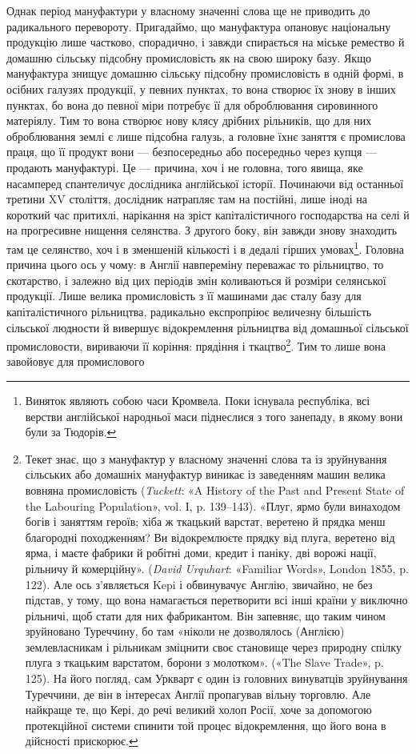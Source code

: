 Однак період мануфактури у власному значенні слова ще не
приводить до радикального перевороту. Пригадаймо, що мануфактура
опановує національну продукцію лише частково, спорадично,
і завжди спирається на міське ремество й домашню
сільську підсобну промисловість як на свою широку базу.
Якщо мануфактура знищує домашню сільську підсобну промисловість
в одній формі, в осібних галузях продукції, у певних
пунктах, то вона створює їх знову в інших пунктах, бо вона до
певної міри потребує її для оброблювання сировинного матеріялу.
Тим то вона створює нову клясу дрібних рільників, що для них
оброблювання землі є лише підсобна галузь, а головне їхнє заняття
є промислова праця, що її продукт вони — безпосередньо
або посередньо через купця — продають мануфактурі. Це —
причина, хоч і не головна, того явища, яке насамперед спантеличує
дослідника англійської історії. Починаючи від останньої
третини XV століття, дослідник натрапляє там на постійні,
лише іноді на короткий час притихлі, нарікання на зріст капіталістичного
господарства на селі й на прогресивне нищення
селянства. З другого боку, він завжди знову знаходить там це
селянство, хоч і в зменшеній кількості і в дедалі гірших умовах\footnote{
Виняток являють собою часи Кромвела. Поки існувала республіка,
всі верстви англійської народньої маси піднеслися з того занепаду,
в якому вони були за Тюдорів.
}.
Головна причина цього ось у чому: в Англії навпереміну переважає
то рільництво, то скотарство, і залежно від цих періодів
змін коливаються й розміри селянської продукції. Лише велика
промисловість з її машинами дає сталу базу для капіталістичного
рільництва, радикально експропріює величезну більшість сільської
людности й вивершує відокремлення рільництва від домашньої
сільської промисловости, вириваючи її коріння: прядіння
і ткацтво\footnote{
Текет знає, що з мануфактур у власному значенні слова та із
зруйнування сільських або домашніх мануфактур виникає із заведенням
машин велика вовняна промисловість (\emph{Tuckett}: «A History of the Past
and Present State of the Labouring Population», vol. I, p. 139--143).
«Плуг, ярмо були винаходом богів і заняттям героїв; хіба ж ткацький
варстат, веретено й прядка менш благородні походженням? Ви відокремлюєте
прядку від плуга, веретено від ярма, і маєте фабрики й робітні
доми, кредит і паніку, дві ворожі нації, рільничу й комерційну».
(\emph{David Urquhart}: «Familiar Words», London 1855, p. 122). Але ось з’являється
Kepi і обвинувачує Англію, звичайно, не без підстав, у тому,
що вона намагається перетворити всі інші країни у виключно рільничі,
щоб стати для них фабрикантом. Він запевняє, що таким чином зруйновано
Туреччину, бо там «ніколи не дозволялось (Англією) землевласникам
і рільникам зміцнити своє становище через природну спілку плуга
з ткацьким варстатом, борони з молотком». («The Slave Trade», p. 125).
На його погляд, сам Уркварт є один із головних винуватців зруйнування
Туреччини, де він в інтересах Англії пропагував вільну торговлю.
Але найкраще те, що Кері, до речі великий холоп Росії, хоче за допомогою
протекційної системи спинити той процес відокремлення, що його вона
в дійсності прискорює.
}. Тим то лише вона завойовує для промислового
